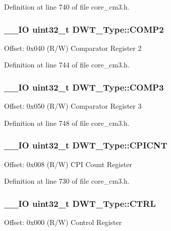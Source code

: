 Definition at line 740 of file core\-\_\-cm3.\-h.

\hypertarget{struct_d_w_t___type_a8927aedbe9fd6bdae8983088efc83332}{
\subsubsection[{C\-O\-M\-P2}]{\setlength{\rightskip}{0pt plus 5cm}\-\_\-\-\_\-\-I\-O {\bf uint32\-\_\-t} D\-W\-T\-\_\-\-Type\-::\-C\-O\-M\-P2}}\label{struct_d_w_t___type_a8927aedbe9fd6bdae8983088efc83332}
Offset\-: 0x040 (R/\-W) Comparator Register 2 

Definition at line 744 of file core\-\_\-cm3.\-h.

\hypertarget{struct_d_w_t___type_a3df15697eec279dbbb4b4e9d9ae8b62f}{
\subsubsection[{C\-O\-M\-P3}]{\setlength{\rightskip}{0pt plus 5cm}\-\_\-\-\_\-\-I\-O {\bf uint32\-\_\-t} D\-W\-T\-\_\-\-Type\-::\-C\-O\-M\-P3}}\label{struct_d_w_t___type_a3df15697eec279dbbb4b4e9d9ae8b62f}
Offset\-: 0x050 (R/\-W) Comparator Register 3 

Definition at line 748 of file core\-\_\-cm3.\-h.

\hypertarget{struct_d_w_t___type_a88cca2ab8eb1b5b507817656ceed89fc}{
\subsubsection[{C\-P\-I\-C\-N\-T}]{\setlength{\rightskip}{0pt plus 5cm}\-\_\-\-\_\-\-I\-O {\bf uint32\-\_\-t} D\-W\-T\-\_\-\-Type\-::\-C\-P\-I\-C\-N\-T}}\label{struct_d_w_t___type_a88cca2ab8eb1b5b507817656ceed89fc}
Offset\-: 0x008 (R/\-W) C\-P\-I Count Register 

Definition at line 730 of file core\-\_\-cm3.\-h.

\hypertarget{struct_d_w_t___type_a37964d64a58551b69ce4c8097210d37d}{
\subsubsection[{C\-T\-R\-L}]{\setlength{\rightskip}{0pt plus 5cm}\-\_\-\-\_\-\-I\-O {\bf uint32\-\_\-t} D\-W\-T\-\_\-\-Type\-::\-C\-T\-R\-L}}\label{struct_d_w_t___type_a37964d64a58551b69ce4c8097210d37d}
Offset\-: 0x000 (R/\-W) Control Register 

